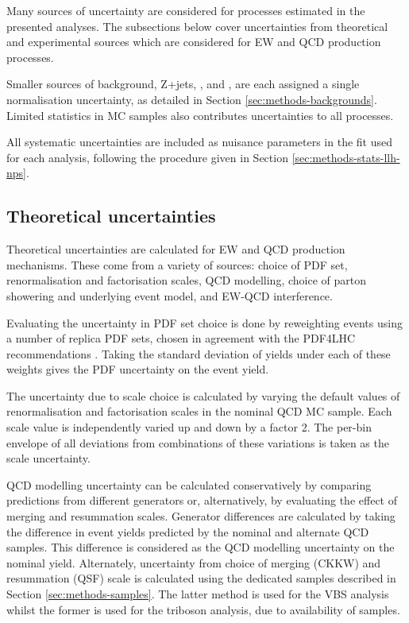 
Many sources of uncertainty are considered for processes estimated in the
presented analyses. The subsections below cover uncertainties from theoretical
and experimental sources which are considered for \ac{EW} and \ac{QCD} \Zyjj
production processes.

Smaller sources of background, Z+jets, \tty, and \WZjj, are each assigned a
single normalisation uncertainty, as detailed in Section
\ref{sec:methods-backgrounds}.
Limited statistics in \ac{MC} samples also contributes uncertainties to all
processes.

All systematic uncertainties are included as nuisance parameters in the fit used
for each analysis, following the procedure given in Section
\ref{sec:methods-stats-llh-nps}.

\subsection{Theoretical uncertainties}
\label{sec:methods-systematics-theory}

Theoretical uncertainties are calculated for \ac{EW} and \ac{QCD} \Zy production
mechanisms. These come from a variety of sources: choice of \ac{PDF} set,
renormalisation and factorisation scales, \ac{QCD} modelling, choice of parton
showering and underlying event model, and \ac{EW}-\ac{QCD} interference.

Evaluating the uncertainty in \ac{PDF} set choice is done by reweighting events
using a number of replica \ac{PDF} sets, chosen in agreement with the PDF4LHC
recommendations \cite{Butterworth2016}. Taking the standard deviation of yields
under each of these weights gives the \ac{PDF} uncertainty on the event yield. 

The uncertainty due to scale choice is calculated by varying the default values of
renormalisation and factorisation scales in the nominal QCD \Zy \ac{MC} sample.
Each scale value is independently varied up and down by a factor 2.
The per-bin envelope of all deviations from combinations of these variations
is taken as the scale uncertainty.

\ac{QCD} modelling uncertainty can be calculated conservatively by comparing
predictions from different generators or, alternatively, by evaluating the
effect of merging and resummation scales. Generator differences are calculated
by taking the difference in event yields predicted by the nominal and alternate
\ac{QCD} \Zy samples. This difference is considered as the \ac{QCD} modelling
uncertainty on the nominal yield.
Alternately, uncertainty from choice of merging (CKKW) and
resummation (QSF) scale is calculated using the dedicated samples described in
Section \ref{sec:methods-samples}. The latter method is used for the \ac{VBS}
analysis whilst the former is used for the triboson analysis, due to
availability of samples.

